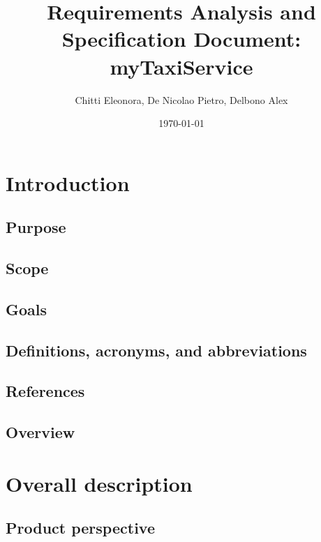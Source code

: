 \documentclass[12pt, a4paper]{report}
\begin{document}
\title{Requirements Analysis and Specification Document: myTaxiService}
\author{Chitti Eleonora, De Nicolao Pietro, Delbono Alex}
\date{\today}
\maketitle
\tableofcontents

\chapter{Introduction}
\label{ch:introduction}

\section{Purpose}


\section{Scope}


\section{Goals}


\section{Definitions, acronyms, and abbreviations}


\section{References}


\section{Overview}


\chapter{Overall description}
\label{ch:overall-desc}

\section{Product perspective}

\end{document}
